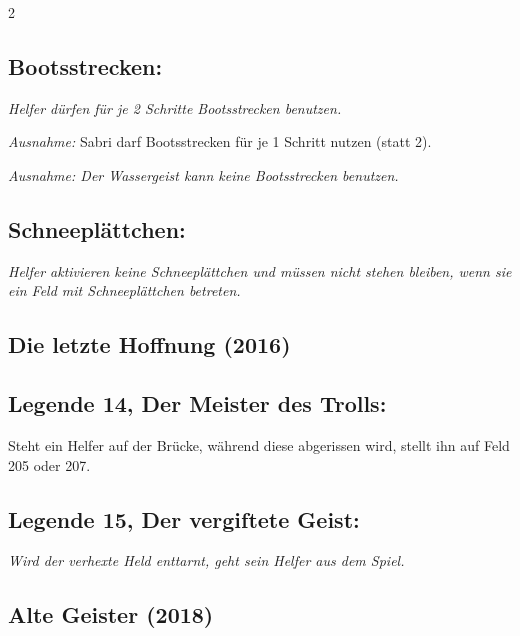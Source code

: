\documentclass[10pt, a4paper, oneside]{book}
\newcommand{\fan}[1]{\textit{#1}}
\begin{document}
\begin{multicols*}{2}
\begin{bgcolor}
\subsection{Bootsstrecken:}

\fan{Helfer dürfen für je 2 Schritte Bootsstrecken benutzen.}
\supercite{BL_RdSK:Der_Unbekannte_Krieger}

\fan{Ausnahme:} Sabri darf Bootsstrecken für je 1 Schritt nutzen (statt 2).
\supercite{MH:Begleitheft}

\fan{Ausnahme: Der Wassergeist kann keine Bootsstrecken benutzen.}



\subsection{Schneeplättchen:}

\fan{Helfer aktivieren keine Schneeplättchen und müssen nicht stehen bleiben, wenn sie ein Feld mit Schneeplättchen betreten.}

\end{bgcolor}



\begin{bgcolor}
\section{Die letzte Hoffnung (2016)}




\subsection{Legende 14, Der Meister des Trolls:}

Steht ein Helfer auf der Brücke, während diese abgerissen wird, stellt ihn auf Feld 205 oder 207.
\supercite{94128}


\subsection{Legende 15, Der vergiftete Geist:}

\fan{Wird der verhexte Held enttarnt, geht sein Helfer aus dem Spiel.}


\end{bgcolor}



\begin{bgcolor}[color-AG]
\section{Alte Geister (2018)}


\end{bgcolor}
\end{multicols*}
\end{document}
